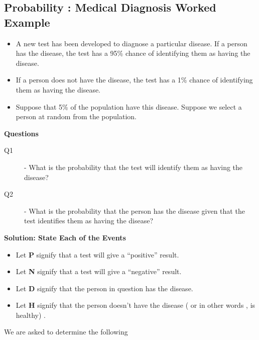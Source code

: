 \documentclass[]{article}
\begin{document}
	
	
	
	\subsection*{Probability : Medical Diagnosis Worked Example}
	
	\begin{itemize}
		\item A new test has been developed to diagnose a particular disease. If a person has the disease, the test has a 95\% chance of identifying them as having the disease. 
		
		\item If a person does not have the disease, the test has a 1\% chance of identifying them as having the disease. 
		\item Suppose that 5\% of the population have this disease. Suppose we select a person at random from the population.
	\end{itemize}
	
	
	
	\noindent \textbf{Questions}
	\begin{description}
		\item[Q1] - What is the probability that the test will identify them as having the disease?
		
		\item[Q2] - What is the probability that the person has the disease given that the test identifies them as having the disease?
	\end{description}
	
	
	\noindent \textbf{Solution: State Each of the Events}
	
	\begin{itemize}
		\item Let \textbf{P} signify that a test will give a “positive” result.
		\item Let \textbf{N} signify that a test will give a “negative” result.	
		\item Let \textbf{D} signify that the person in question has the disease.
		\item Let \textbf{H} signify that the person doesn’t have the disease ( or in other words , is healthy) .
	\end{itemize}
	\smallskip
	
	\noindent We are asked to determine the following 
	
\end{document}
